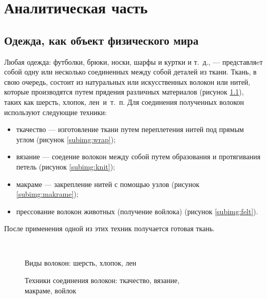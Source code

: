 \chapter{Аналитическая часть}

\section{Одежда, как объект физического мира}

Любая одежда: футболки, брюки, носки, шарфы и куртки и т.~д., --- представляeт
собой одну или несколько соединенных между собой деталей из ткани. Ткань, в
свою очередь, состоит из натуральных или искусственных волокон или нитей,
которые производятся путем прядения различных материалов (рисунок \ref{fig:fibers}),
таких как шерсть, хлопок, лен~и~т.~п.
Для соединения полученных волокон используют следующие техники:
\begin{itemize}[left=\parindent]
    \item ткачество --- изготовление ткани путем переплетения нитей под прямым
        углом (рисунок \ref{subimg:wrap});
    \item вязание --- соедение волокон между собой путем образования и
        протягивания петель (рисунок \ref{subimg:knit});
    \item макраме --- закрепление нитей с помощью узлов (рисунок \ref{subimg:makrame});
    \item прессование волокон животных (получение войлока) (рисунок \ref{subimg:felt}).
\end{itemize}
После применения одной из этих техник получается готовая ткань.

~\\
\begin{figure}[ht!]
    \vspace{-4ex}
    \centering
    \hspace{4ex}
    \hspace{4ex}
    \caption{Виды волокон: 
              шерсть,
              хлопок,
              лен}
    \label{fig:fibers}
\end{figure}

\begin{figure}[ht!]
    \vspace{-4ex}
    \centering
    \hspace{4ex}
    \vfill
    \hspace{4ex}
    \hspace{4ex}
    \caption{Техники соединения волокон:
              ткачество,
              вязание,~\\
              макраме,
              войлок
            }
    \label{fig:getCloth}
\end{figure}

